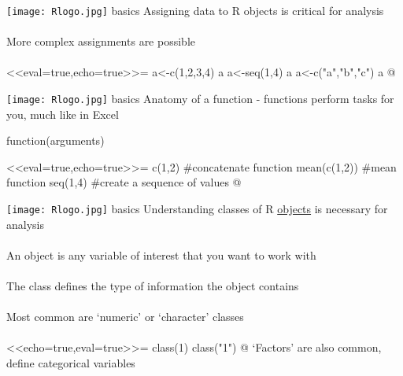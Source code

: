\documentclass[xcolor=svgnames]{beamer}
\begin{document}
\begin{frame}[t,fragile]{\texttt{[image: Rlogo.jpg]} \hspace{0.01in} basics}
Assigning data to R objects is critical for analysis\\~\\
More complex assignments are possible\\~\\
<<eval=true,echo=true>>=
a<-c(1,2,3,4)
a
a<-seq(1,4)
a
a<-c("a","b","c")
a
@
\end{frame}

\begin{frame}[fragile]{\texttt{[image: Rlogo.jpg]} \hspace{0.01in} basics}
Anatomy of a function - functions perform tasks for you, much like in Excel
\begin{center}
\Large
function(arguments)
\end{center}
<<eval=true,echo=true>>=
c(1,2) #concatenate function
mean(c(1,2)) #mean function
seq(1,4) #create a sequence of values
@
\end{frame}

\begin{frame}[fragile,t]{\texttt{[image: Rlogo.jpg]} \hspace{0.01in} basics}
Understanding classes of R \href{http://cran.r-project.org/doc/manuals/r-release/R-lang.html#Vector-objects}{objects} is necessary for analysis \\~\\
An object is any variable of interest that you want to work with\\~\\
The class defines the type of information the object contains\\~\\
Most common are `numeric' or `character' classes \\~\\
<<echo=true,eval=true>>=
class(1)
class("1")
@
\vspace{0.2in}
\pause
`Factors' are also common, define categorical variables
\end{frame}
\end{document}
